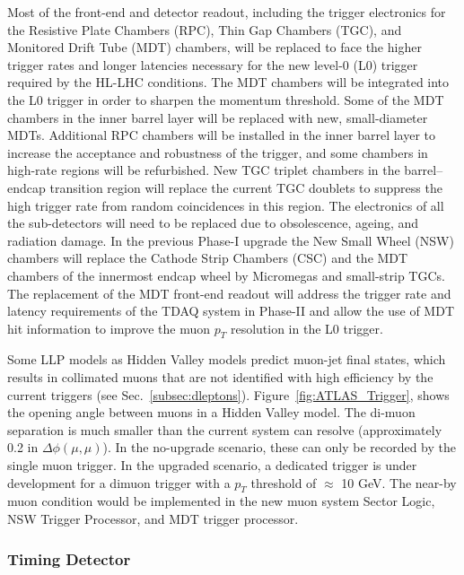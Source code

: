 Most of the front-end and detector readout, including the trigger electronics for the Resistive Plate Chambers (RPC), Thin Gap Chambers (TGC),
and Monitored Drift Tube (MDT) chambers, will be replaced to face
the higher trigger rates and longer latencies necessary for the new level-0 (L0) trigger required by the HL-LHC conditions. 
The MDT chambers will be integrated into the L0 trigger in order to sharpen the momentum threshold. Some of the MDT chambers in the inner barrel layer will be replaced with new, small-diameter MDTs. 
Additional RPC chambers will be installed in the inner barrel layer to increase the
acceptance and robustness of the trigger, and some chambers in high-rate regions will be
refurbished. 
New TGC triplet chambers in the barrel--endcap transition region will replace the current TGC doublets to suppress the high trigger rate from random
coincidences in this region. 
The electronics of all the sub-detectors will need to be replaced due to obsolescence, ageing, and radiation
damage. In the previous Phase-I upgrade the New Small Wheel (NSW) chambers will replace the Cathode Strip Chambers (CSC) and
the MDT chambers of the innermost endcap wheel by Micromegas and small-strip TGCs.
The replacement of the MDT front-end readout will address the trigger rate
and latency requirements of the TDAQ system in Phase-II and allow the use of MDT hit
information to improve the muon $p_T$ resolution in the L0 trigger.

Some LLP models as Hidden Valley models \cite{Strassler:2006im} predict muon-jet final states, which   results in collimated muons that are not identified with high efficiency by the current triggers (see Sec.~\ref{subsec:dleptons}).
Figure~\ref{fig:ATLAS_Trigger}, shows the opening angle between muons in a Hidden Valley model. The di-muon separation
is much smaller than the current system can resolve (approximately 0.2 in $\Delta\phi(\mu,\mu)$). In
the no-upgrade scenario, these can only be recorded by the single muon trigger. In the upgraded scenario,
a dedicated trigger is under development for a dimuon trigger with a $p_T$
threshold of $\approx$ 10 GeV. The near-by muon condition would be implemented in the new muon system
Sector Logic, NSW Trigger Processor, and MDT trigger processor.




\subsubsection{Timing Detector} \label{sec:upgradetiming}

